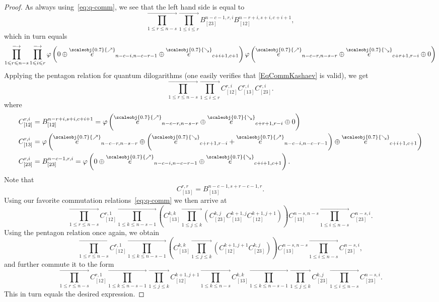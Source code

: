 \documentclass[11pt, reqno]{amsart}
\theoremstyle{definition}
\numberwithin{equation}{section}
\def\longra{\longrightarrow}
\newcommand{\hr}[1]{\left(#1\right)}                                                    %
\def\le{\leqslant}
\newcommand{\nears}{\scaleobj{0.7}{\nearrow}}
\newcommand{\sears}{\scaleobj{0.7}{\searrow}}
\newcommand{\nee}{\overset{\nears}{e}}
\newcommand{\seee}{\overset{\sears}{e}}
\begin{document}
\begin{proof}
As always using~\eqref{eq:q-comm}, we see that the left hand side is equal to
$$
\prod_{1 \le r \le n-s}^{\longra} \prod_{1 \le i \le r}^{\longra} B_{[23]}^{n-c-1,r,i} B_{[12]}^{n-r+i,s+i,c+i+1},
$$
which in turn equals
$$
\prod_{1 \le r \le n-s}^{\longra} \prod_{1 \le i \le r}^{\longra} \varphi\hr{0 \oplus \nee_{n-c-i,n-c-r-1} \oplus \seee_{c+i+1,c+1}}
\varphi\hr{\nee_{n-c-r,n-s-r} \oplus \seee_{c+r+1,r-i} \oplus 0}
$$
Applying the pentagon relation for quantum dilogarithms (one easily verifies that \eqref{EqCommKashaev} is valid), we get
$$
\prod_{1 \le r \le n-s}^{\longra} \prod_{1 \le i \le r}^{\longra} C_{[12]}^{r,i} C_{[13]}^{r,i} C_{[23]}^{r,i}.
$$
where
\begin{align*}
C_{[12]}^{r,i} &= B_{[12]}^{n-r+i,s+i,c+i+1} = \varphi\hr{\nee_{n-c-r,n-s-r} \oplus \seee_{c+r+1,r-i} \oplus 0} \\
C_{[13]}^{r,i} &= \varphi\hr{\nee_{n-c-r,n-s-r} \oplus \hr{\seee_{c+r+1,r-i} + \nee_{n-c-i,n-c-r-1}} \oplus \seee_{c+i+1,c+1}} \\
C_{[23]}^{r,i} &= B_{[23]}^{n-c-1,r,i}  = \varphi\hr{0 \oplus \nee_{n-c-i,n-c-r-1} \oplus \seee_{c+i+1,c+1}}.
\end{align*}
Note that
$$
C_{[13]}^{r,r} = B_{[13]}^{n-c-1,s+r-c-1,r}.
$$
Using our favorite commutation relations~\eqref{eq:q-comm} we then arrive at
$$
\prod_{1 \le r \le n-s}^{\longra} C_{[12]}^{r,1} \prod_{1 \le k \le n-s-1}^{\longra} \hr{C_{[13]}^{k,k} \prod_{1 \le j \le k}^{\longra} \hr{C_{[23]}^{k,j} C_{[13]}^{k+1,j} C_{[12]}^{k+1,j+1}} } C_{[13]}^{n-s,n-s} \prod_{1 \le i \le n-s}^{\longra}C_{[23]}^{n-s,i}.
$$
Using the pentagon relation once again, we obtain
$$
\prod_{1 \le r \le n-s}^{\longra} C_{[12]}^{r,1} \prod_{1 \le k \le n-s-1}^{\longra} \hr{C_{[13]}^{k,k} \prod_{1 \le j \le k}^{\longra} \hr{C_{[12]}^{k+1,j+1} C_{[23]}^{k,j}} } C_{[13]}^{n-s,n-s} \prod_{1 \le i \le n-s}^{\longra}C_{[23]}^{n-s,i},
$$
and further commute it to the form
$$
\prod_{1 \le r \le n-s}^{\longra} C_{[12]}^{r,1} \prod_{1 \le k \le n-s-1}^{\longra} \prod_{1 \le j \le k}^{\longra} C_{[12]}^{k+1,j+1} \prod_{1 \le k \le n-s}^{\longra} C_{[13]}^{k,k} \prod_{1 \le k \le n-s-1}^{\longra} \prod_{1 \le j \le k}^{\longra} C_{[23]}^{k,j} \prod_{1 \le i \le n-s}^{\longra}C_{[23]}^{n-s,i}.
$$
This in turn equals the desired expression.
\end{proof}
\end{document}
